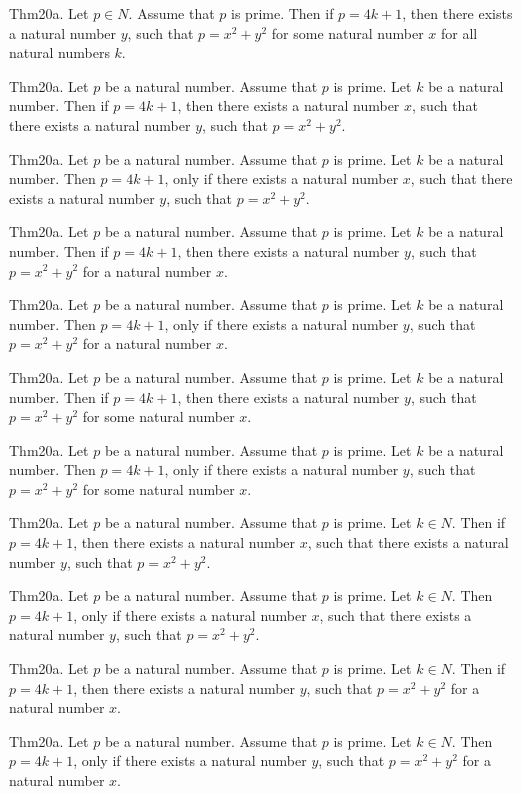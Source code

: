 \documentclass{article}
\begin{document}
Thm20a. Let $p \in N$. Assume that $p$ is prime. Then if $p = 4 k + 1$, then there exists a natural number $y$, such that $p = x ^{ 2}+ y ^{ 2}$ for some natural number $x$ for all natural numbers $k$.

Thm20a. Let $p$ be a natural number. Assume that $p$ is prime. Let $k$ be a natural number. Then if $p = 4 k + 1$, then there exists a natural number $x$, such that there exists a natural number $y$, such that $p = x ^{ 2}+ y ^{ 2}$.

Thm20a. Let $p$ be a natural number. Assume that $p$ is prime. Let $k$ be a natural number. Then $p = 4 k + 1$, only if there exists a natural number $x$, such that there exists a natural number $y$, such that $p = x ^{ 2}+ y ^{ 2}$.

Thm20a. Let $p$ be a natural number. Assume that $p$ is prime. Let $k$ be a natural number. Then if $p = 4 k + 1$, then there exists a natural number $y$, such that $p = x ^{ 2}+ y ^{ 2}$ for a natural number $x$.

Thm20a. Let $p$ be a natural number. Assume that $p$ is prime. Let $k$ be a natural number. Then $p = 4 k + 1$, only if there exists a natural number $y$, such that $p = x ^{ 2}+ y ^{ 2}$ for a natural number $x$.

Thm20a. Let $p$ be a natural number. Assume that $p$ is prime. Let $k$ be a natural number. Then if $p = 4 k + 1$, then there exists a natural number $y$, such that $p = x ^{ 2}+ y ^{ 2}$ for some natural number $x$.

Thm20a. Let $p$ be a natural number. Assume that $p$ is prime. Let $k$ be a natural number. Then $p = 4 k + 1$, only if there exists a natural number $y$, such that $p = x ^{ 2}+ y ^{ 2}$ for some natural number $x$.

Thm20a. Let $p$ be a natural number. Assume that $p$ is prime. Let $k \in N$. Then if $p = 4 k + 1$, then there exists a natural number $x$, such that there exists a natural number $y$, such that $p = x ^{ 2}+ y ^{ 2}$.

Thm20a. Let $p$ be a natural number. Assume that $p$ is prime. Let $k \in N$. Then $p = 4 k + 1$, only if there exists a natural number $x$, such that there exists a natural number $y$, such that $p = x ^{ 2}+ y ^{ 2}$.

Thm20a. Let $p$ be a natural number. Assume that $p$ is prime. Let $k \in N$. Then if $p = 4 k + 1$, then there exists a natural number $y$, such that $p = x ^{ 2}+ y ^{ 2}$ for a natural number $x$.

Thm20a. Let $p$ be a natural number. Assume that $p$ is prime. Let $k \in N$. Then $p = 4 k + 1$, only if there exists a natural number $y$, such that $p = x ^{ 2}+ y ^{ 2}$ for a natural number $x$.
\end{document}
